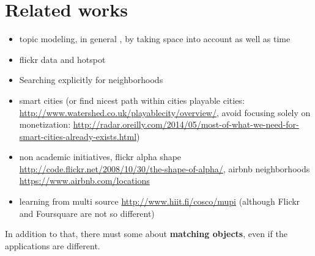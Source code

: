 \chapter{Related works}
\label{chap:related}

\begin{itemize}

\item topic modeling, in general \autocite{topicModel}, by taking space into
account \autocite{GeoTopicYin11, GeoTopicKurashima2013, nestedChinese13,%
NonGaussianTopicKling14} as well as time \autocite{GeoScope, TwitterBurst13}


\item flickr data and hotspot \autocite{TagHotspot12, Hotspots12}

\item Searching explicitly for neighborhoods
\autocite{Rattenbury2009, Livehoods12, SocioMap12, Hoodsquare13}

\item smart cities \autocite{HelsinkiSCC11, Eunoia13, SmartCities13} (or
find nicest path within cities \cite{Quercia2014}
playable cities: \url{http://www.watershed.co.uk/playablecity/overview/},
\ie{} avoid focusing solely on monetization:
\url{http://radar.oreilly.com/2014/05/most-of-what-we-need-for-smart-cities-already-exists.html})



\item non academic initiatives, flickr alpha shape
\url{http://code.flickr.net/2008/10/30/the-shape-of-alpha/}, airbnb
neighborhoods \url{https://www.airbnb.com/locations}

\item learning from multi source \url{http://www.hiit.fi/cosco/mupi} (although
Flickr and Foursquare are not so different)

\end{itemize}

In addition to that,
there must some about \textbf{matching objects}, even if the applications are
different.
